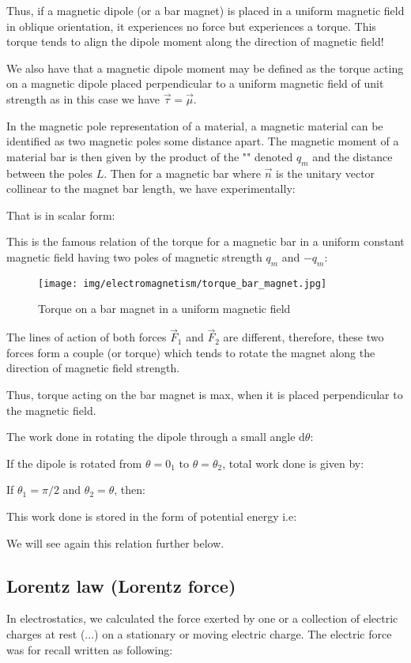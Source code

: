 	Thus, if a magnetic dipole (or a bar magnet) is placed in a uniform magnetic field in oblique orientation, it experiences no force but experiences a torque. This torque tends to align the dipole moment along the direction of magnetic field!
	
	We also have that a magnetic dipole moment may be defined as the torque acting on a magnetic dipole placed perpendicular to a uniform magnetic field of unit strength as in this case we have $\vec{\tau}=\vec{\mu}$.

	In the magnetic pole representation of a material, a magnetic material can be identified as two magnetic poles some distance apart. The magnetic moment of a material bar is then given by the product of the "" denoted $q_m$ and the distance between the poles $L$. Then for a magnetic bar where $\vec{n}$ is the unitary vector collinear to the magnet bar length, we have experimentally:
	
	That is in scalar form:
	
	This is the famous relation of the torque for a magnetic bar in a uniform constant magnetic field having two poles of magnetic strength $q_m$ and $-q_m$:
	\begin{figure}[H]
		\centering
		\texttt{[image: img/electromagnetism/torque\_bar\_magnet.jpg]}
		\caption{Torque on a bar magnet in a uniform magnetic field}
	\end{figure}
	The lines of action of both forces $\vec{F}_1$ and $\vec{F}_2$ are different, therefore, these two forces form a couple (or torque) which tends to rotate the magnet along the direction of magnetic field strength. 
	
	Thus, torque acting on the bar magnet is max, when it is placed perpendicular to the magnetic field.

	The work done in rotating the dipole through a small angle $\mathrm{d}\theta$:
	
	If the dipole is rotated from $\theta=0_1$ to $\theta=\theta_2$, total work done is given by:
	
	If $\theta_1=\pi/2$ and $\theta_2=\theta$, then:
	
	This work done is stored in the form of potential energy i.e:
	
	We will see again this relation further below.
	
	\pagebreak
	\subsection{Lorentz law (Lorentz force)}\label{lorentz force}
	In electrostatics, we calculated the force exerted by one or a collection of electric charges at rest (...) on a stationary or moving electric charge. The electric force was for recall written as following:
	
